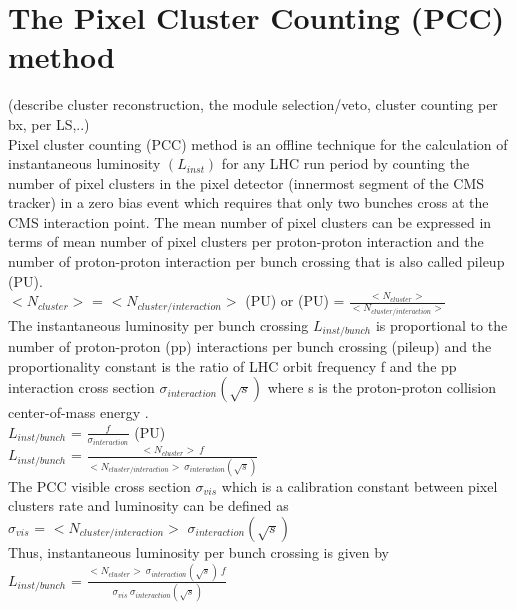 \section{The Pixel Cluster Counting (PCC) method}
\label{sec:pcc}
(describe cluster reconstruction, the module selection/veto, cluster counting per bx, per LS,..) \\

Pixel cluster counting (PCC)  method is an offline technique for the calculation of instantaneous luminosity $(L_{inst})$ for any LHC run period by counting the number of pixel clusters in the pixel detector (innermost segment of the CMS tracker) in a zero bias event which requires that only two bunches cross at the CMS interaction point. The mean number of pixel clusters can be expressed in terms of mean number of pixel clusters per proton-proton interaction and the number of proton-proton interaction per bunch crossing that is also called pileup (PU). \\

$<N_{cluster}>$ = $<N_{cluster/interaction}>$ (PU)  or (PU) = $\frac{<N_{cluster}>}{<N_{cluster/interaction}>}$ \\

The instantaneous luminosity per bunch crossing $L_{inst/bunch}$ is proportional to the number of proton-proton (pp) interactions per bunch crossing (pileup) and the proportionality constant is the ratio of  LHC orbit frequency f and the pp interaction cross section $\sigma_{interaction}(\sqrt{s})$ where s is the proton-proton collision center-of-mass energy \cite{CMS-PAS-LUM-12-001}. \\

$L_{inst/bunch}$ = $\frac{f}{\sigma_{interaction}}$ (PU)  \\

$L_{inst/bunch}$ = $\frac{<N_{cluster}> \: f }{<N_{cluster/interaction}> \: \sigma_{interaction}(\sqrt{s})}$ \\

The PCC visible cross section $\sigma_{vis}$ which is a calibration constant between pixel clusters rate and luminosity can be defined as \\

$\sigma_{vis}$ = $<N_{cluster/interaction}>$  $\sigma_{interaction}(\sqrt{s})$ \\

\newpage Thus, instantaneous luminosity per bunch crossing is given by \\

$L_{inst/bunch}$ = $\frac{<N_{cluster}> \: \sigma_{interaction}(\sqrt{s}) \: f }{ \:\sigma_{vis} \: \sigma_{interaction}(\sqrt{s})}$ \\

